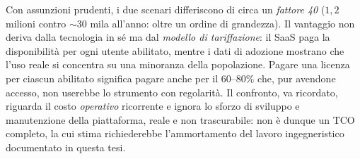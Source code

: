 Con assunzioni prudenti, i due scenari differiscono di circa un \emph{fattore 40} (\texteuro$1{,}2$ milioni contro $\sim$\texteuro$30$ mila all'anno: oltre un ordine di grandezza).
Il vantaggio non deriva dalla tecnologia in sé ma dal \emph{modello di tariffazione}: il SaaS paga la disponibilità per ogni utente abilitato, mentre i dati di adozione
mostrano che l'uso reale si concentra su una minoranza della popolazione. Pagare una licenza per ciascun abilitato significa pagare anche per il $60$--$80\%$ che,
pur avendone accesso, non userebbe lo strumento con regolarità. Il confronto, va ricordato, riguarda il costo \emph{operativo} ricorrente e ignora lo sforzo di sviluppo
e manutenzione della piattaforma, reale e non trascurabile: non è dunque un TCO completo, la cui stima richiederebbe l'ammortamento del lavoro ingegneristico documentato in questa tesi.

